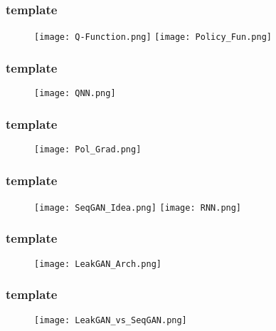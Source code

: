 \documentclass{beamer}
\begin{document}
\begin{frame}
\frametitle{template}
\begin{figure}[ht]
  \texttt{[image: Q-Function.png]}
  \texttt{[image: Policy\_Fun.png]}
\end{figure}
\end{frame}



\begin{frame}
\frametitle{template}
\begin{figure}[ht]
  \texttt{[image: QNN.png]}
\end{figure}
\end{frame}

\begin{frame}
\frametitle{template}
\begin{figure}[ht]
  \texttt{[image: Pol\_Grad.png]}
\end{figure}
\end{frame}


\begin{frame}
\frametitle{template}
\begin{figure}[ht]
  \texttt{[image: SeqGAN\_Idea.png]}
  \texttt{[image: RNN.png]}
\end{figure}
\end{frame}


\begin{frame}
\frametitle{template}
\begin{figure}[ht]
  \texttt{[image: LeakGAN\_Arch.png]}
\end{figure}
\end{frame}

\begin{frame}
\frametitle{template}
\begin{figure}[ht]
  \texttt{[image: LeakGAN\_vs\_SeqGAN.png]}
\end{figure}
\end{frame}

% 
% 
% 
% 
% 
% 
% 
\end{document}
